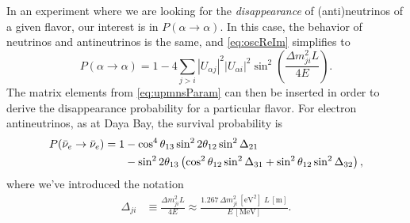 \documentclass[../thesis.tex]{subfiles}
\begin{document}
In an experiment where we are looking for the \emph{disappearance} of (anti)\-neu\-trinos of a given flavor, our interest is in \(P(\alpha \rightarrow \alpha)\). In this case, the behavior of neutrinos and antineutrinos is the same, and \autoref{eq:oscReIm} simplifies to
\begin{equation}
  P(\alpha \rightarrow \alpha) = 1 - 4 \sum_{j>i} |U_{\alpha j}|^2 |U_{\alpha
    i}|^2 \sin^2\left( \frac{\Delta m^2_{ji} L}{4E} \right). 
\end{equation}
The matrix elements from \autoref{eq:upmnsParam} can then be inserted in order to derive the disappearance probability for a particular flavor. For electron antineutrinos, as at Daya Bay, the survival probability is
\begin{align}
  \label{eq:survProbDybFull}
  \begin{split}
    P(\bar\nu_e \rightarrow \bar\nu_e) =
    1 &- \cos^4\theta_{13}\sin^2 2\theta_{12} \sin^2 \Delta_{21} \\
    &- \sin^2 2\theta_{13}\left( \cos^2\theta_{12} \sin^2 \Delta_{31} + \sin^2\theta_{12} \sin^2
      \Delta_{32}\right),
  \end{split}
\end{align}
where we've introduced the notation
\begin{align*}
  \Delta_{ji} &\equiv \frac{\Delta m^2_{ji}L}{4E}
           \approx \frac{1.267\, \Delta m^2_{ji}\,\mathrm{[eV^2]}\;
           L\,\mathrm{[m]}}{E\,\mathrm{[MeV]}}.
\end{align*}
\end{document}
